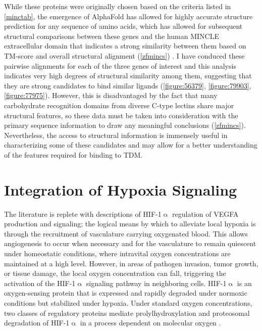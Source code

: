 While these proteins were originally chosen based on the criteria listed in \autoref{minctab}, the emergence of AlphaFold has allowed for highly accurate structure prediction for any sequence of amino acids, which has allowed for subsequent structural comparisons between these genes and the human MINCLE extracellular domain that indicates a strong similarity between them based on TM\hyp{}score and overall structural alignment (\autoref{zfmincs}) \citep{Jumper2021}. I have conduced these pairwise alignments for each of the three genes of interest and this analysis indicates very high degrees of structural similarity among them, suggesting that they are strong candidates to bind similar ligands (\autoref{figure:56379}, \autoref{figure:79903}, \autoref{figure:77975}). However, this is disadvantaged by the fact that many carbohydrate recognition domains from diverse C\hyp{}type lectins share major structural features, so these data must be taken into consideration with the primary sequence information to draw any meaningful conclusions (\autoref{zfmincs}). Nevertheless, the access to structural information is immensely useful in characterizing some of these candidates and may allow for a better understanding of the features required for binding to TDM.

\section{Integration of Hypoxia Signaling}\label{hypoxia}

The literature is replete with descriptions of HIF\hyp{}1$\upalpha$ regulation of VEGFA production and signaling; the logical means by which to alleviate local hypoxia is through the recruitment of vasculature carrying oxygenated blood. This allows angiogenesis to occur when necessary and for the vasculature to remain quiescent under homeostatic conditions, where intravital oxygen concentrations are maintained at a high level. However, in areas of pathogen invasion, tumor growth, or tissue damage, the local oxygen concentration can fall, triggering the activation of the HIF\hyp{}1$\upalpha$ signaling pathway in neighboring cells. HIF\hyp{}1$\upalpha$ is an oxygen\hyp{}sensing protein that is expressed and rapidly degraded under normoxic conditions but stabilized under hypoxia. Under standard oxygen concentrations, two classes of regulatory proteins mediate prolylhydroxylation and proteosomal degradation of HIF\hyp{}1$\upalpha$ in a process dependent on molecular oxygen \citep{Corcoran2016, Hong2004, Masoud2015}.

